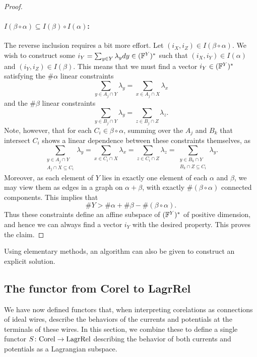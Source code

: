 \begin{proof}
\paragraph{$I(\beta\circ\alpha) \subseteq I(\beta) \circ I(\alpha)$:} The
reverse inclusion requires a bit more effort. Let $(i_X,i_Z) \in
I(\beta\circ\alpha)$. We wish to construct some $i_Y = \sum_{y \in Y} \lambda_y
dy \in ({\mathbb F}^{Y})^\ast$ such that $(i_X,i_Y) \in I(\alpha)$ and $(i_Y,i_Z) \in
I(\beta)$.  This means that we must find a vector $i_Y \in ({\mathbb F}^{Y})^\ast$
satisfying the $\#\alpha$ linear constraints
\[
  \sum_{y \in A_j \cap Y} \lambda_y = \sum_{x \in A_j \cap X} \lambda_x
\]
and the $\#\beta$ linear constraints
\[
  \sum_{y \in B_j \cap Y} \lambda_y = \sum_{z \in B_j \cap Z} \lambda_z.
\]
Note, however, that for each $C_i \in \beta\circ\alpha$, summing over the $A_j$
and $B_k$ that intersect $C_i$ shows a linear dependence between these constraints
themselves, as
\[
  \sum_{\substack{y \in A_j \cap Y \\ A_j \cap X \subseteq C_i}} \lambda_y =
  \sum_{x \in C_i \cap X} \lambda_x = \sum_{z \in C_i \cap Z}
  \lambda_z = \sum_{\substack{y \in B_k \cap Y \\ B_k \cap Z \subseteq C_i}}
  \lambda_y.
\]
Moreover, as each element of $Y$ lies in exactly one element of each $\alpha$
and $\beta$, we may view them as edges in a graph on $\alpha+\beta$, with
exactly $\#(\beta\circ\alpha)$ connected components. This implies that
\[
  \# Y > \#\alpha + \#\beta -\#(\beta\circ\alpha).
\]
Thus these constraints define an affine subspace of $({\mathbb F}^{Y})^\ast$ of positive
dimension, and hence we can always find a vector $i_Y$ with the desired
property. This proves the claim. 
\end{proof}

Using elementary methods, an algorithm can also
be given to construct an explicit solution.

\subsection{The functor from Corel to LagrRel}

We have now defined functors that, when interpreting corelations as connections
of ideal wires, describe the behaviors of the currents and potentials at the
terminals of these wires. In this section, we combine these to define a single
functor $S{\colon} \mathrm{Corel} \to \mathrm{LagrRel}$ describing the behavior of both
currents and potentials as a Lagrangian subspace.

